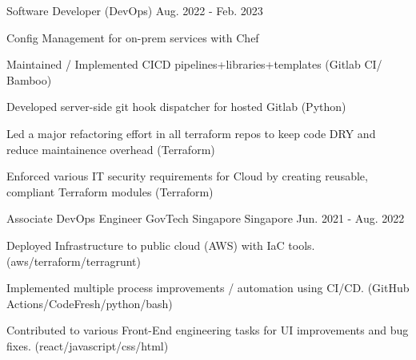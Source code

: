 \begin{cventries}
  \cventry
    {Software Developer (DevOps)} %
    {} %
    {} %
    {Aug. 2022 - Feb. 2023} %
    {
      \begin{cvitems} %
        \item {Config Management for on-prem services with Chef}
        \item {Maintained / Implemented CICD pipelines+libraries+templates (Gitlab CI/ Bamboo)}
        \item {Developed server-side git hook dispatcher for hosted Gitlab (Python)}
        \item {Led a major refactoring effort in all terraform repos to keep code DRY and reduce maintainence overhead (Terraform)}
        \item {Enforced various IT security requirements for Cloud by creating reusable, compliant Terraform modules (Terraform)}
      \end{cvitems}
    }

  \cventry
    {Associate DevOps Engineer} %
    {GovTech Singapore} %
    {Singapore} %
    {Jun. 2021 - Aug. 2022} %
    {
      \begin{cvitems} %
        \item {Deployed Infrastructure to public cloud (AWS) with IaC tools. (aws/terraform/terragrunt)}
        \item {Implemented multiple process improvements / automation using CI/CD. (GitHub Actions/CodeFresh/python/bash)}
        \item {Contributed to various Front-End engineering tasks for UI improvements and bug fixes. (react/javascript/css/html)}
      \end{cvitems}
    }



\end{cventries}

